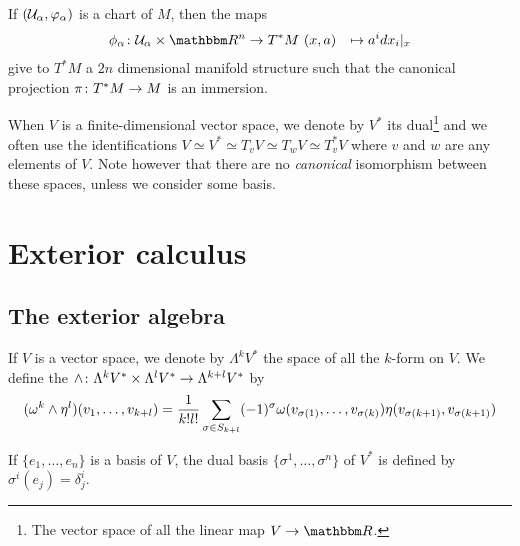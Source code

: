If $(\mathcal{U}_{\alpha},\varphi_{\alpha})$ is a chart of $M$, then the maps
		\begin{equation}
		\begin{aligned}
			\phi_{\alpha} \colon \mU_{\alpha}\times\eR^n &\to T^*M\
			(x,a)&\mapsto a^idx_i|_x
		\end{aligned}
	\end{equation}	
give to $T^*M$ a $2n$ dimensional manifold structure such that the canonical projection $\pi\colon T^*M\to M$ is an immersion.

When $V$ is a finite-dimensional vector space, we denote by $V^*$ its dual\footnote{The vector space of all the linear map $V\to \eR$.} and we often use the identifications $V\simeq V^*\simeq T_vV\simeq T_wV\simeq T^*_vV$ where $v$ and $w$ are any elements of $V$. Note however that there are no \emph{canonical} isomorphism between these spaces, unless we consider some basis.

\section{Exterior calculus}

\subsection{The exterior algebra}

\begin{definition}
    If $V$ is a vector space, we denote by $\Lambda^kV^*$ the space of all the $k$-form on $V$. We define the  $\wedge\colon \Lambda^kV^*\times\Lambda^lV^*\to \Lambda^{k+l}V^*$ by
    \begin{equation}
      (\omega^k\wedge\eta^l)(v_1,\ldots,v_{k+l})
      =\frac{1}{k!l!}\sum_{\sigma\in S_{k+l}} (-1)^{\sigma}   \omega(v_{\sigma(1)},\ldots,v_{\sigma(k)})\eta(v_{\sigma(k+1)},v_{\sigma(k+1)})
    \end{equation}
\end{definition}
If $\{e_1,\ldots,e_n\}$ is a basis of $V$, the dual basis $\{\sigma^1,\ldots,\sigma^n\}$ of $V^*$ is defined by $\sigma^i(e_j)=\delta^i_j$.

